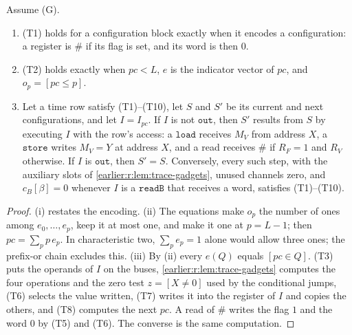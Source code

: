 \begin{lemma}\label{earlier:r:lem:trace-step}
Assume (G).
\begin{enumerate}[label=(\roman*)]
\item (T1) holds for a configuration block exactly when it encodes a
configuration: a register is \(\#\) if its flag is set, and its word is
then \(0\).
\item (T2) holds exactly when \(\mathit{pc}<L\), \(e\) is the indicator
vector of \(\mathit{pc}\), and \(o_p=[\mathit{pc}\le p]\).
\item Let a time row satisfy (T1)--(T10), let \(S\) and \(S'\) be its
current and next configurations, and let \(I=I_{\mathit{pc}}\). If \(I\)
is not \(\mathtt{out}\), then \(S'\) results from \(S\) by executing
\(I\) with the row's access: a \(\mathtt{load}\) receives \(M_V\) from
address \(X\), a \(\mathtt{store}\) writes \(M_V=Y\) at address \(X\),
and a read receives \(\#\) if \(R_F=1\) and \(R_V\) otherwise. If \(I\)
is \(\mathtt{out}\), then \(S'=S\). Conversely, every such step, with
the auxiliary slots of \cref{earlier:r:lem:trace-gadgets}, unused channels zero,
and \(c_B[\beta]=0\) whenever \(I\) is a \(\mathtt{readB}\) that receives a
word, satisfies (T1)--(T10).
\end{enumerate}
\end{lemma}
\begin{proof}
(i) restates the encoding. (ii) The equations make \(o_p\) the number
of ones among \(e_0,\ldots,e_p\), keep it at most one, and make it one
at \(p=L-1\); then \(\mathit{pc}=\sum_pp\,e_p\). In characteristic two,
\(\sum_pe_p=1\) alone would allow three ones; the prefix-or chain
excludes this. (iii) By (ii) every \(e(Q)\) equals
\([\mathit{pc}\in Q]\). (T3) puts the operands of \(I\) on the buses,
\cref{earlier:r:lem:trace-gadgets} computes the four operations and the zero test
\(z=[X\ne0]\) used by the conditional jumps, (T6) selects the value
written, (T7) writes it into the register of \(I\) and copies the
others, and (T8) computes the next \(\mathit{pc}\). A read of \(\#\)
writes the flag \(1\) and the word \(0\) by (T5) and (T6). The converse
is the same computation.
\end{proof}


